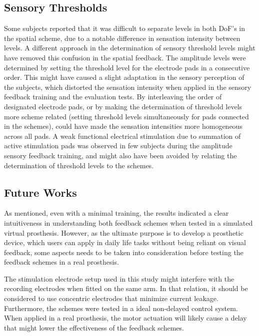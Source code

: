 \subsection{Sensory Thresholds}
Some subjects reported that it was difficult to separate levels in both DoF's in the spatial scheme, due to a notable difference in sensation intensity between levels. A different approach in the determination of sensory threshold levels might have removed this confusion in the spatial feedback. The amplitude levels were determined by setting the threshold level for the electrode pads in a consecutive order. This might have caused a slight adaptation in the sensory perception of the subjects, which distorted the sensation intensity when applied in the sensory feedback training and the evaluation tests. By interleaving the order of designated electrode pads, or by making the determination of threshold levels more scheme related (setting threshold levels simultaneously for pads connected in the schemes), could have made the sensation intensities more homogeneous across all pads. A weak functional electrical stimulation due to summation of active stimulation pads was observed in few subjects during the amplitude sensory feedback training, and might also have been avoided by relating the determination of threshold levels to the schemes. 

\subsection{Future Works}
As mentioned, even with a minimal training, the results indicated a clear intuitiveness in understanding both feedback schemes when tested in a simulated virtual prosthesis. However, as the ultimate purpose is to develop a prosthetic device, which users can apply in daily life tasks without being reliant on visual feedback, some aspects needs to be taken into consideration before testing the feedback schemes in a real prosthesis. 

The stimulation electrode setup used in this study might interfere with the recording electrodes when fitted on the same arm. In that relation, it should be considered to use concentric electrodes that minimize current leakage. Furthermore, the schemes were tested in a ideal non-delayed control system. When applied in a real prosthesis, the motor actuation will likely cause a delay that might lower the effectiveness of the feedback schemes.   

